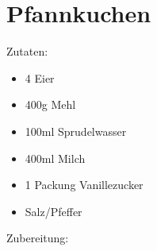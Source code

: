 \section{Pfannkuchen}

Zutaten:

\begin{itemize}
    \item 4 Eier
	\item 400g Mehl
	\item 100ml Sprudelwasser
	\item 400ml Milch
	\item 1 Packung Vanillezucker
	\item Salz/Pfeffer
\end{itemize}

\noindent Zubereitung:

\noindent


\newpage
\mbox{}
\vfill
\begin{center}
\end{center}
\vfill
\mbox{ }
\newpage
